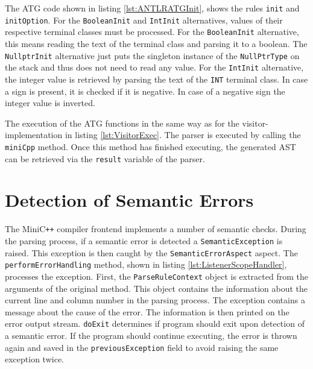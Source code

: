 The ATG code shown in listing \ref{lst:ANTLRATGInit}, shows the rules \verb|init| and \verb|initOption|. For the \verb|BooleanInit| and \verb|IntInit| alternatives, values of their respective terminal classes must be processed. For the \verb|BooleanInit| alternative, this means reading the text of the terminal class and parsing it to a boolean. The \verb|NullptrInit| alternative just puts the singleton instance of the \verb|NullPtrType| on the stack and thus does not need to read any value. For the \verb|IntInit| alternative, the integer value is retrieved by parsing the text of the \verb|INT| terminal class. In case a sign is present, it is checked if it is negative. In case of a negative sign the integer value is inverted. 



The execution of the ATG functions in the same way as for the visitor-implementation in listing \ref{lst:VisitorExec}. The parser is executed by calling the \verb|miniCpp| method. Once this method has finished executing, the generated AST can be retrieved via the \verb|result| variable of the parser. 


\section{Detection of Semantic Errors}

The MiniC\verb|++| compiler frontend implements a number of semantic checks. During the parsing process, if a semantic error is detected a \verb|SemanticException| is raised. This exception is then caught by the \verb|SemanticErrorAspect| aspect. The \verb|performErrorHandling| method, shown in listing \ref{lst:ListenerScopeHandler}, processes the exception. First, the \verb|ParseRuleContext| object is extracted from the arguments of the original method. This object contains the information about the current line and column number in the parsing process. The exception contains a message about the cause of the error. The information is then printed on the error output stream. \verb|doExit| determines if program should exit upon detection of a semantic error. If the program should continue executing, the error is thrown again and saved in the \verb|previousException| field to avoid raising the same exception twice.    


